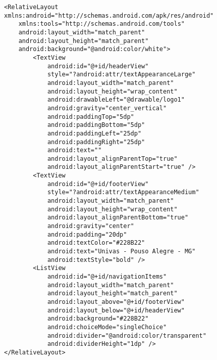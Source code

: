 \begin{lstlisting}[style=custom_XML]
	<RelativeLayout xmlns:android="http://schemas.android.com/apk/res/android"
    xmlns:tools="http://schemas.android.com/tools"
    android:layout_width="match_parent"
    android:layout_height="match_parent"
    android:background="@android:color/white">
	    <TextView
	        android:id="@+id/headerView"
	        style="?android:attr/textAppearanceLarge"
	        android:layout_width="match_parent"
	        android:layout_height="wrap_content"
	        android:drawableLeft="@drawable/logo1"
	        android:gravity="center_vertical"
	        android:paddingTop="5dp"
	        android:paddingBottom="5dp"
	        android:paddingLeft="25dp"
	        android:paddingRight="25dp"
	        android:text=""
	        android:layout_alignParentTop="true"
	        android:layout_alignParentStart="true" />
	    <TextView
	        android:id="@+id/footerView"
	        style="?android:attr/textAppearanceMedium"
	        android:layout_width="match_parent"
	        android:layout_height="wrap_content"
	        android:layout_alignParentBottom="true"
	        android:gravity="center"
	        android:padding="20dp"
	        android:textColor="#228B22"
	        android:text="Univas - Pouso Alegre - MG"
	        android:textStyle="bold" />
	    <ListView
	        android:id="@+id/navigationItems"
	        android:layout_width="match_parent"
	        android:layout_height="match_parent"
	        android:layout_above="@+id/footerView"
	        android:layout_below="@+id/headerView"
	        android:background="#228B22"
	        android:choiceMode="singleChoice"
	        android:divider="@android:color/transparent"
	        android:dividerHeight="1dp" />
</RelativeLayout>
\end{lstlisting}